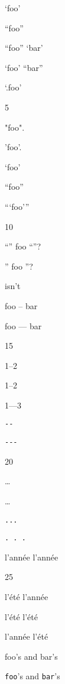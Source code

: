 `foo'

``foo''

``foo'' `bar'

`foo' ``bar''

`.foo'

5

"foo".

'foo'.

`foo'

``foo''

```foo'''

10

``'' foo ``''?

'' foo ''?

isn't

foo -- bar

foo --- bar

15

1--2

1--2

1---3

\texttt{-{}-}

\texttt{-{}-{}-}

20

{\ldots}

{\ldots}

\texttt{...}

\texttt{. . .}

l'année l'année

25

l'été l'année

l'été l'été

l'année l'été

foo's and bar's

\texttt{foo}'s and \texttt{bar}'s
